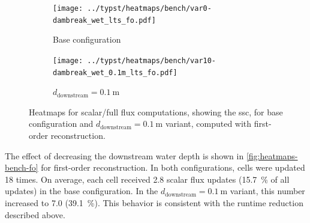 \begin{figure}[htbp]
  \centering
  \begin{subfigure}[t]{0.45\textwidth}
    \centering
    \texttt{[image: ../typst/heatmaps/bench/var0-dambreak\_wet\_lts\_fo.pdf]}
    \caption{
      Base configuration
    }
    \label{fig:heatmap-var0-fo}
  \end{subfigure}
  \hspace{0.5cm}
  \begin{subfigure}[t]{0.45\textwidth}
    \centering
    \texttt{[image: ../typst/heatmaps/bench/var10-dambreak\_wet\_0.1m\_lts\_fo.pdf]}
    \caption{
      $d_{\text{downstream}} = \SI{0.1}{\meter}$
    }
    \label{fig:heatmap-var10-fo}
  \end{subfigure}

  \caption[
    Heatmaps for base configuration and $d_{\text{downstream}} = \SI{0.1}{\meter}$ using first-order reconstruction.
  ]{
    Heatmaps for scalar/full flux computations, showing the \gls{ssc}, for base configuration and $d_{\text{downstream}} = \SI{0.1}{\meter}$ variant, computed with first-order reconstruction.
  }
  \label{fig:heatmaps-bench-fo}
\end{figure}

The effect of decreasing the downstream water depth is shown in \autoref{fig:heatmaps-bench-fo} for first-order reconstruction.
In both configurations, cells were updated 18 times.
\hypertarget{scalar-update-perc}{%
On average, each cell received 2.8 scalar flux updates 
(\SI{15.7}{\percent} of all updates) in the base configuration.
In the $d_{\text{downstream}} = \SI{0.1}{\meter}$ variant, this number increased to 7.0 (\SI{39.1}{\percent}).
}%
This behavior is consistent with the runtime reduction described above. 

